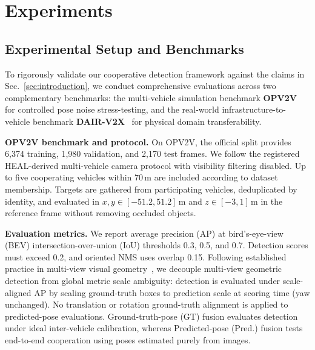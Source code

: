 \section{Experiments}
\subsection{Experimental Setup and Benchmarks}
\label{sec:protocol}
To rigorously validate our cooperative detection framework against the claims in Sec.~\ref{sec:introduction}, we conduct comprehensive evaluations across two complementary benchmarks: the multi-vehicle simulation benchmark \textbf{OPV2V}~\cite{opv2v} for controlled pose noise stress-testing, and the real-world infrastructure-to-vehicle benchmark \textbf{DAIR-V2X}~\cite{dairv2x} for physical domain transferability.

\textbf{OPV2V benchmark and protocol.} On OPV2V, the official split provides 6,374 training, 1,980 validation, and 2,170 test frames. We follow the registered HEAL-derived multi-vehicle camera protocol with visibility filtering disabled. Up to five cooperating vehicles within 70\,m are included according to dataset membership. Targets are gathered from participating vehicles, deduplicated by identity, and evaluated in $x,y\in[-51.2,51.2]$\,m and $z\in[-3,1]$\,m in the reference frame without removing occluded objects.

\textbf{Evaluation metrics.} We report average precision (AP) at bird's-eye-view (BEV) intersection-over-union (IoU) thresholds 0.3, 0.5, and 0.7. Detection scores must exceed 0.2, and oriented NMS uses overlap 0.15. Following established practice in multi-view visual geometry~\cite{dust3r,vggt}, we decouple multi-view geometric detection from global metric scale ambiguity: detection is evaluated under scale-aligned AP by scaling ground-truth boxes to prediction scale at scoring time (yaw unchanged). No translation or rotation ground-truth alignment is applied to predicted-pose evaluations. Ground-truth-pose (GT) fusion evaluates detection under ideal inter-vehicle calibration, whereas Predicted-pose (Pred.) fusion tests end-to-end cooperation using poses estimated purely from images.

